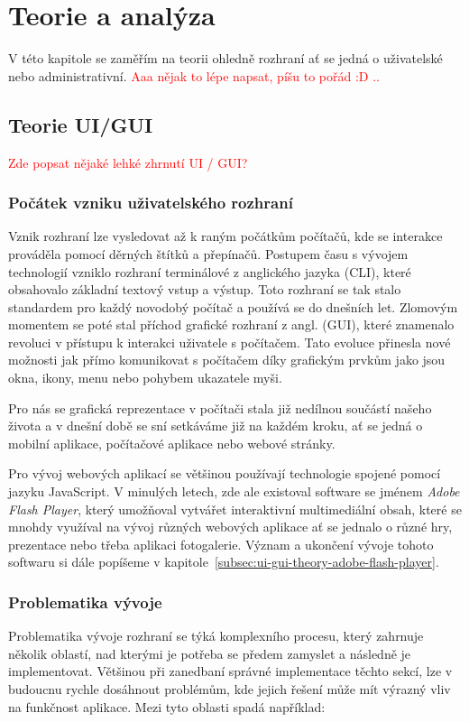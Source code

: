 \chapter{Teorie a analýza}
\label{ch:theory_and_analysis}
V této kapitole se zaměřím na teorii ohledně rozhraní ať se jedná o uživatelské nebo administrativní. \textcolor{red}{Aaa nějak to lépe napsat, píšu to pořád :D ..}

\section{Teorie UI/GUI}
\label{sec:ui-gui-theory}
\textcolor{red}{Zde popsat nějaké lehké zhrnutí UI / GUI?}

\subsection{Počátek vzniku uživatelského rozhraní}
\label{subsec:ui-gui-theory-beginning}
Vznik rozhraní lze vysledovat až k raným počátkům počítačů, kde se interakce prováděla pomocí děrných štítků a přepínačů. Postupem času s vývojem technologií vzniklo rozhraní terminálové z anglického jazyka \textit{} (CLI), které obsahovalo základní textový vstup a výstup. Toto rozhraní se tak stalo standardem pro každý novodobý počítač a používá se do dnešních let. Zlomovým momentem se poté stal příchod grafické rozhraní z angl. \textit{} (GUI), které znamenalo revoluci v přístupu k interakci uživatele s počítačem. Tato evoluce přinesla nové možnosti jak přímo komunikovat s počítačem díky grafickým prvkům jako jsou okna, ikony, menu nebo pohybem ukazatele myši.

Pro nás se grafická reprezentace v počítači stala již nedílnou součástí našeho života a v dnešní době se sní setkáváme již na každém kroku, ať se jedná o mobilní aplikace, počítačové aplikace nebo webové stránky.

Pro vývoj webových aplikací se většinou používají technologie spojené pomocí jazyku JavaScript. V minulých letech, zde ale existoval software se jménem \textit{Adobe Flash Player}, který umožňoval vytvářet interaktivní multimediální obsah, které se mnohdy využíval na vývoj různých webových aplikace ať se jednalo o různé hry, prezentace nebo třeba aplikaci fotogalerie. Význam a ukončení vývoje tohoto softwaru si dále popíšeme v kapitole~\ref{subsec:ui-gui-theory-adobe-flash-player}.

\subsection{Problematika vývoje}
\label{subsec:ui-gui-theory-problems}
Problematika vývoje rozhraní se týká komplexního procesu, který zahrnuje několik oblastí, nad kterými je potřeba se předem zamyslet a následně je implementovat. Většinou při zanedbaní správné implementace těchto sekcí, lze v budoucnu rychle dosáhnout problémům, kde jejich řešení může mít výrazný vliv na funkčnost aplikace. Mezi tyto oblasti spadá například:

